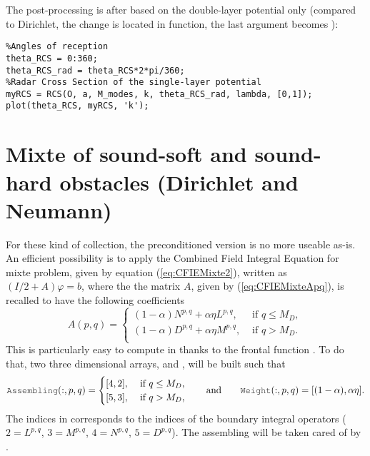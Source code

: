 The post-processing is after based on the double-layer potential only (compared to Dirichlet, the change is located in \RCS function, the last argument \code{[1,0]} becomes \code{[0,1]}):
\begin{lstlisting}
%Angles of reception
theta_RCS = 0:360;
theta_RCS_rad = theta_RCS*2*pi/360;
%Radar Cross Section of the single-layer potential
myRCS = RCS(O, a, M_modes, k, theta_RCS_rad, lambda, [0,1]);
plot(theta_RCS, myRCS, 'k');
\end{lstlisting}

\section{Mixte of sound-soft and sound-hard obstacles (Dirichlet and Neumann)}

For these kind of collection, the preconditioned version is no more useable as-is. An efficient possibility is to apply the Combined Field Integral Equation for mixte problem, given by equation (\ref{eq:CFIEMixte2}), written as $(I/2 +A)\varphi = b$, where the the matrix $A$, given by  (\ref{eq:CFIEMixteApq}), is recalled to have the following coefficients
$$
A(p,q) = 
\begin{cases}
(1-\alpha) N^{p,q} + \alpha\eta L^{p,q}, & \text{ if } q \leq M_D,\\
(1-\alpha) D^{p,q} + \alpha\eta M^{p,q}, & \text{ if } q > M_D.\\
\end{cases}
$$
This is particularly easy to compute in \mudiff thanks to the frontal function \IntegralOperator. To do that, two three dimensional arrays,  and , will be built such that
$$
\code{Assembling}(:, p,q) = 
\begin{cases}
[4,2], & \text{ if } q \leq M_D,\\
[5,3], & \text{ if } q > M_D,
\end{cases}\qquad\text{and}\qquad
\code{Weight}(:, p,q) = [(1-\alpha), \alpha\eta].
$$
The indices in  corresponds to the indices of the boundary integral operators ($2=L^{p,q}$, $3=M^{p,q}$, $4=N^{p,q}$, $5=D^{p,q}$). The assembling will be taken cared of by \IntegralOperator.
